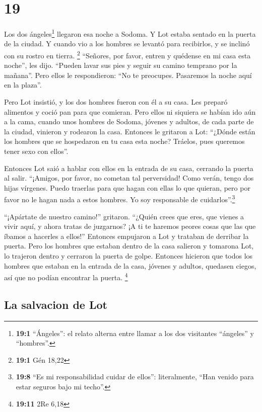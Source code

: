 \hypertarget{section-18}{%
\section{19}\label{section-18}}

 Los dos ángeles\footnote{\textbf{19:1} ``Ángeles'': el
  relato alterna entre llamar a los dos visitantes ``ángeles'' y
  ``hombres''.} llegaron esa noche a Sodoma. Y Lot estaba sentado en la
puerta de la ciudad. Y cuando vio a los hombres se levantó para
recibirlos, y se inclinó con su rostro en tierra. \footnote{\textbf{19:1}
  Gén 18,22}  ``Señores, por favor, entren y quédense en
mi casa esta noche'', les dijo. ``Pueden lavar sus pies y seguir su
camino temprano por la mañana''. Pero ellos le respondieron: ``No te
preocupes. Pasaremos la noche aquí en la plaza''.

 Pero Lot insistió, y los dos hombres fueron con él a su
casa. Les preparó alimentos y coció pan para que comieran.
 Pero ellos ni siquiera se habían ido aún a la cama,
cuando unos hombres de Sodoma, jóvenes y adultos, de cada parte de la
ciudad, vinieron y rodearon la casa.  Entonces le gritaron
a Lot: ``¿Dónde están los hombres que se hospedaron en tu casa esta
noche? Tráelos, pues queremos tener sexo con ellos''.

 Entonces Lot saió a hablar con ellos en la entrada de su
casa, cerrando la puerta al salir.  ``¡Amigos, por favor,
no cometan tal perversidad!  Como verán, tengo dos hijas
vírgenes. Puedo traerlas para que hagan con ellas lo que quieran, pero
por favor no le hagan nada a estos hombres. Yo soy responsable de
cuidarlos''.\footnote{\textbf{19:8} ``Es mi responsabilidad cuidar de
  ellos'': literalmente, ``Han venido para estar seguros bajo mi
  techo''.}

 ``¡Apártate de nuestro camino!'' gritaron. ``¿Quién crees
que eres, que vienes a vivir aquí, y ahora tratas de juzgarnos? ¡A ti te
haremos peores cosas que las que íbamos a hacerles a ellos!'' Entonces
empujaron a Lot y trataban de derribar la puerta.  Pero
los hombres que estaban dentro de la casa salieron y tomarona Lot, lo
trajeron dentro y cerraron la puerta de golpe.  Entonces
hicieron que todos los hombres que estaban en la entrada de la casa,
jóvenes y adultos, quedasen ciegos, así que no podían encontrar la
puerta. \footnote{\textbf{19:11} 2Re 6,18}

\hypertarget{la-salvacion-de-lot}{%
\subsection{La salvacion de Lot}\label{la-salvacion-de-lot}}

